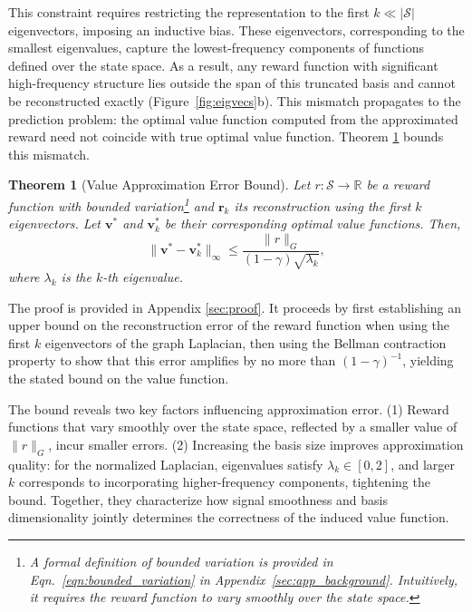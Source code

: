 \documentclass{article}
\theoremstyle{plain}
\newtheorem{theorem}{Theorem}[section]
\theoremstyle{definition}
\theoremstyle{remark}
\newcommand{\ValueApproxName}{Value Approximation Error Bound}
\begin{document}
This constraint requires restricting the representation to the first $k \ll |\mathscr{S}|$ eigenvectors, imposing an inductive bias. These eigenvectors, corresponding to the smallest eigenvalues, capture the lowest-frequency components of functions defined over the state space. As a result, any reward function with significant high-frequency structure lies outside the span of this truncated basis and cannot be reconstructed exactly (Figure~\textcolor{neelam}{\ref{fig:eigvecs}b}). This mismatch propagates to the prediction problem: the optimal value function computed from the approximated reward need not coincide with true optimal value function. Theorem \ref{theorem:the-one-main-paper} bounds this mismatch.

\begin{theorem}[\ValueApproxName]
Let $r: \mathscr{S} \to \mathbb{R}$ be a reward function with bounded variation\footnote{A formal definition of \textit{bounded variation} is provided in Eqn.~\ref{eqn:bounded_variation} in Appendix~\ref{sec:app_background}. Intuitively, it requires the reward function to vary smoothly over the state space.} and $\mathbf{r}_k$ its reconstruction using the first $k$ eigenvectors. Let $\mathbf{v}^*$ and $\mathbf{v}^*_k$ be their corresponding optimal value functions. Then,
\begin{equation}
    \|\mathbf{v}^* - \mathbf{v}^*_k\|_\infty \le \frac{\|r\|_G}{(1-\gamma)\sqrt{\lambda_k}},
\end{equation}
where $\lambda_k$ is the $k$-th eigenvalue.
\label{theorem:the-one-main-paper}
\end{theorem}

The proof is provided in Appendix \ref{sec:proof}. It proceeds by first establishing an upper bound on the reconstruction error of the reward function when using the first $k$ eigenvectors of the graph Laplacian, then using the Bellman contraction property to show that this error amplifies by no more than $(1-\gamma)^{-1}$, yielding the stated bound on the value function. 

The bound reveals two key factors influencing approximation error. 
(1) Reward functions that vary smoothly over the state space, reflected by a smaller value of $\|r\|_G$, incur smaller errors.
(2) Increasing the basis size improves approximation quality: for the normalized Laplacian, eigenvalues satisfy $\lambda_k \in [0,2]$, and larger $k$ corresponds to incorporating higher-frequency components, tightening the bound.
Together, they characterize how signal smoothness and basis dimensionality jointly determines the correctness of the induced value function. 
\end{document}
